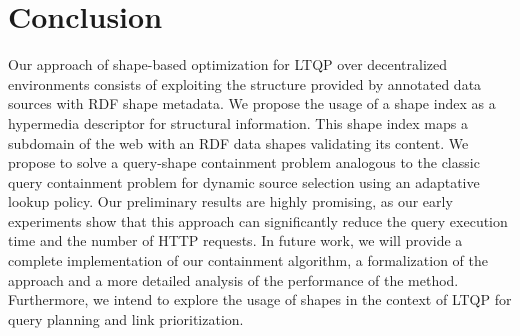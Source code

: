 \section{Conclusion}
Our approach of shape-based optimization for LTQP over decentralized environments consists of exploiting the structure provided by
annotated data sources with RDF shape metadata. 
We propose the usage of a shape index as a hypermedia descriptor for structural information.
This shape index maps a subdomain of the web with an RDF data shapes validating its content.
We propose to solve a query-shape containment problem analogous to the classic query containment problem for dynamic source selection
using an adaptative lookup policy. 
Our preliminary results are highly promising,
as our early experiments show that this approach can significantly reduce the query execution time and the number of HTTP requests.
In future work, we will provide a complete implementation of our containment algorithm,
a formalization of the approach and a more detailed analysis of the performance of the method.
Furthermore, we intend to explore the usage of shapes in the context of LTQP for query planning and link prioritization.